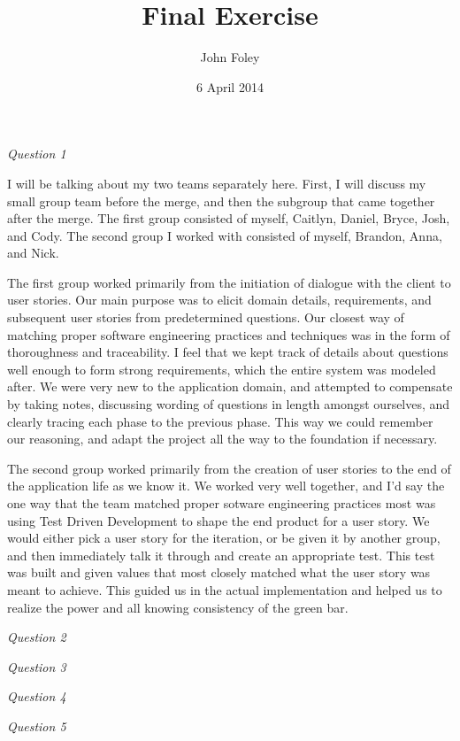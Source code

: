 \documentclass[11pt]{article}
\title{Final Exercise}
\author{John Foley}
\date{6 April 2014}
\newcommand{\tab}{\hspace*{2em}}
\begin{document}
\maketitle

\thispagestyle{empty}

\begin{doublespace}

\emph{Question 1}

\tab I will be talking about my two teams separately here. First, I will discuss my small group team before the merge, and then the subgroup that came together after the merge. The first group consisted of myself, Caitlyn, Daniel, Bryce, Josh, and Cody. The second group I worked with consisted of myself, Brandon, Anna, and Nick. 

\tab The first group worked primarily from the initiation of dialogue with the client to user stories. Our main purpose was to elicit domain details, requirements, and subsequent user stories from predetermined questions. Our closest way of matching proper software engineering practices and techniques was in the form of thoroughness and traceability. I feel that we kept track of details about questions well enough to form strong requirements, which the entire system was modeled after. We were very new to the application domain, and attempted to compensate by taking notes, discussing wording of questions in length amongst ourselves, and clearly tracing each phase to the previous phase. This way we could remember our reasoning, and adapt the project all the way to the foundation if necessary.

\tab The second group worked primarily from the creation of user stories to the end of the application life as we know it. We worked very well together, and I'd say the one way that the team matched proper sotware engineering practices most was using Test Driven Development to shape the end product for a user story. We would either pick a user story for the iteration, or be given it by another group, and then immediately talk it through and create an appropriate test. This test was built and given values that most closely matched what the user story was meant to achieve. This guided us in the actual implementation and helped us to realize the power and all knowing consistency of the green bar. 

\emph{Question 2}

\emph{Question 3}

\emph{Question 4}

\emph{Question 5}


\end{doublespace}
\end{document}
